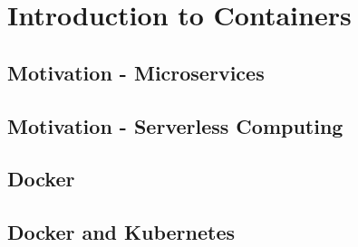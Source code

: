 \chapter{Introduction to Containers}
\label{c:container}

\section{Motivation - Microservices}
\label{s:motivation-microservices}


\section{Motivation - Serverless Computing}
\label{s:motivation-serverless}


\section{Docker}
\label{s:motivation-docker}


\section{Docker and Kubernetes}
\label{s:motivation-docker-kubernetes}

